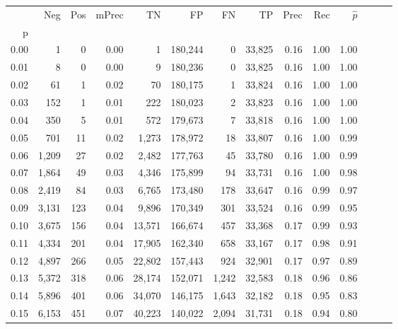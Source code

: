 \begin{tabular}{rrrrrrrrrrrrrr}
\toprule
{} &    Neg &    Pos & mPrec &       TN &       FP &      FN &      TP &  Prec &   Rec & $\hat{p}$ \\
p    &        &        &       &          &          &         &         &       &       &           \\
\midrule
0.00 &      1 &      0 &  0.00 &        1 &  180,244 &       0 &  33,825 &  0.16 &  1.00 &      1.00 \\
0.01 &      8 &      0 &  0.00 &        9 &  180,236 &       0 &  33,825 &  0.16 &  1.00 &      1.00 \\
0.02 &     61 &      1 &  0.02 &       70 &  180,175 &       1 &  33,824 &  0.16 &  1.00 &      1.00 \\
0.03 &    152 &      1 &  0.01 &      222 &  180,023 &       2 &  33,823 &  0.16 &  1.00 &      1.00 \\
0.04 &    350 &      5 &  0.01 &      572 &  179,673 &       7 &  33,818 &  0.16 &  1.00 &      1.00 \\
0.05 &    701 &     11 &  0.02 &    1,273 &  178,972 &      18 &  33,807 &  0.16 &  1.00 &      0.99 \\
0.06 &  1,209 &     27 &  0.02 &    2,482 &  177,763 &      45 &  33,780 &  0.16 &  1.00 &      0.99 \\
0.07 &  1,864 &     49 &  0.03 &    4,346 &  175,899 &      94 &  33,731 &  0.16 &  1.00 &      0.98 \\
0.08 &  2,419 &     84 &  0.03 &    6,765 &  173,480 &     178 &  33,647 &  0.16 &  0.99 &      0.97 \\
0.09 &  3,131 &    123 &  0.04 &    9,896 &  170,349 &     301 &  33,524 &  0.16 &  0.99 &      0.95 \\
0.10 &  3,675 &    156 &  0.04 &   13,571 &  166,674 &     457 &  33,368 &  0.17 &  0.99 &      0.93 \\
0.11 &  4,334 &    201 &  0.04 &   17,905 &  162,340 &     658 &  33,167 &  0.17 &  0.98 &      0.91 \\
0.12 &  4,897 &    266 &  0.05 &   22,802 &  157,443 &     924 &  32,901 &  0.17 &  0.97 &      0.89 \\
0.13 &  5,372 &    318 &  0.06 &   28,174 &  152,071 &   1,242 &  32,583 &  0.18 &  0.96 &      0.86 \\
0.14 &  5,896 &    401 &  0.06 &   34,070 &  146,175 &   1,643 &  32,182 &  0.18 &  0.95 &      0.83 \\
0.15 &  6,153 &    451 &  0.07 &   40,223 &  140,022 &   2,094 &  31,731 &  0.18 &  0.94 &      0.80 \\

\end{tabular}
